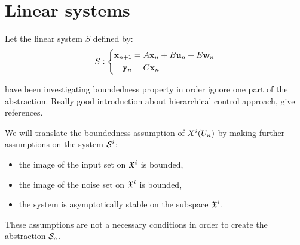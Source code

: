 \newcommand{\xinf}{\underline{\vect{x}}}%
\newcommand{\xsup}{\overline{\vect{x}}}%
\newcommand{\xinit}{\vect{x}_0}%
\newcommand{\xn}{\vect{x}_n}%
\newcommand{\un}{\vect{u}_n}%
\newcommand{\wn}{\vect{w}_n}%
\newcommand{\yn}{\vect{y}_n}%
\newcommand{\xnn}{\vect{x}_{n+1}}%
\newcommand{\Sproc}{$\mathcal{S}$-procedure}%
%
\section{Linear systems}
Let the linear system $S$ defined by:
\begin{equation} \label{lin_sys}
S:
\left\{
\begin{aligned}
\xnn &= A \xn + B \un + E \wn \\
\yn &= C \xn
\end{aligned}
\right.
\end{equation}

\cite{liu2014abstraction} have been investigating boundedness property in order ignore one part of the abstraction.
Really good introduction about hierarchical control approach, give references.


We will translate the boundedness assumption of $X^i(U_n)$ by making further assumptions on the system $\mathcal{S}^i$:
\begin{itemize}[noitemsep,nolistsep]
\item the image of the input set on $\mathfrak{X}^i$ is bounded,
\item the image of the noise set on $\mathfrak{X}^i$ is bounded,
\item the system is asymptotically stable on the subspace $\mathfrak{X}^i$.
\end{itemize}
These assumptions are not a necessary conditions in order to create the abstraction $\mathcal{S}_a$.

